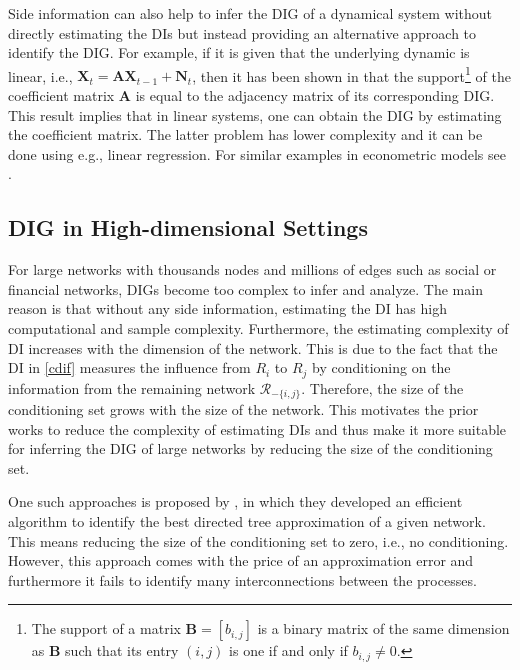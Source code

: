 Side information can also help to infer the DIG of a dynamical system without directly estimating the DIs but instead providing an alternative approach to identify the DIG. 
For example, if it is given that the underlying dynamic is linear, i.e., $\textbf{X}_t = \textbf{AX}_{t-1} + \textbf{N}_t$, then it has been shown in \citet{acc2014} that the support\footnote{The support of a matrix $\textbf{B}=[b_{i,j}]$ is a binary matrix of the same dimension as $\textbf{B}$ such that its entry $(i,j)$ is one if and only if $b_{i,j}\neq0$.} of the coefficient matrix $\textbf{A}$ is equal to the adjacency matrix of its corresponding DIG.   
This result implies that in linear systems, one can obtain the DIG by estimating the coefficient matrix. The latter problem has lower complexity and it can be done using e.g., linear regression. 
For similar examples in econometric models see \citet{etesami2018econometric}.

  





\subsection{DIG in High-dimensional Settings}
For large networks with thousands nodes and millions of edges such as social or financial networks, DIGs become too complex to infer and analyze.
The main reason is that without any side information, estimating the DI has high computational and sample complexity. 
Furthermore, the estimating complexity of DI increases with the dimension of the network.
This is due to the fact that the DI in \eqref{cdif} measures the influence from $R_i$ to $R_j$ by conditioning on the information from the remaining network $\mathcal{R}_{-\{i,j\}}$. 
Therefore, the size of the conditioning set grows with the size of the network.
This motivates the prior works to reduce the complexity of estimating  DIs and thus make it more suitable for inferring the DIG of large networks by reducing the size of the conditioning set. 


One such approaches is proposed by \citet{quinn2013efficient}, in which they developed an efficient algorithm to identify the best directed tree approximation of a given network.
This means reducing the size of the conditioning set to zero, i.e., no conditioning.  
However, this approach comes with the price of an approximation error and furthermore it fails to identify many interconnections between the processes. 

